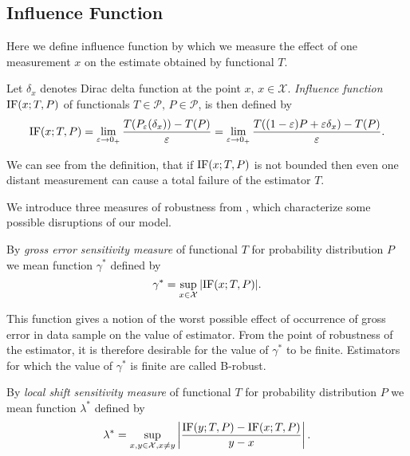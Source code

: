 \subsection{Influence  Function}

Here we define influence function by which we measure the effect of one measurement $x$ on the estimate obtained by functional $T$.

\begin{definition}
	Let $\delta_x$ denotes Dirac delta function at the point $x,\, x \in \mathcal{X}$. \emph{Influence function} $\mathrm{IF}({x};T,P)$ of functionals $T \in \mathcal{P},\, P \in \mathcal{P}$, is then defined by
	\begin{equation}
		\mathrm{IF}({x};T,P) = \lim_{\varepsilon \rightarrow 0_+} \frac{T(P_\varepsilon(\delta_x)) - T(P)}{\varepsilon} = \lim_{\varepsilon \rightarrow 0_+} \frac{T((1-\varepsilon)P + \varepsilon\delta_x) - T(P)}{\varepsilon}.
	\end{equation} 
\end{definition}

\noindent We can see from the definition, that if $\mathrm{IF}({x};T,P)$ is not bounded then even one distant measurement can cause a total failure of the estimator $T$.

We introduce three measures of robustness from \cite{Antoch92}, which characterize some possible disruptions of our model. 

\begin{definition}
	By \emph{gross error sensitivity measure} of functional $T$ for probability distribution $P$ we mean function  $\gamma^*$ defined by 
	\begin{equation}
		\gamma^* = \sup_{x \in \mathcal{X}} |\mathrm{IF}({x};T,P)|.
	\end{equation}
\end{definition}
\noindent This function gives a notion of the worst possible effect of occurrence of gross error in data sample on the value of estimator.  From the point of robustness of the estimator, it is therefore desirable for the value of $\gamma^*$ to be finite. Estimators for which the value of $\gamma^*$ is finite are called B-robust.

\begin{definition}
	By \emph{local shift sensitivity measure} of functional $T$ for probability distribution $P$ we mean function  $\lambda^*$ defined by 
	\begin{equation}
			\lambda^* = \sup_{x,y \in \mathcal{X},x \neq y}  \left| \frac{\mathrm{IF}({y};T,P) - \mathrm{IF}({x};T,P)}{y-x} \right|.
	\end{equation}
\end{definition}

